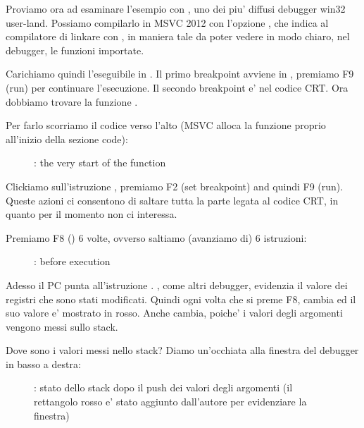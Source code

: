 \clearpage
{}
\myindex{\olly}

Proviamo ora ad esaminare l'esempio con \olly, uno dei piu' diffusi debugger win32 user-land.
Possiamo compilarlo in MSVC 2012 con l'opzione , che indica al compilatore di linkare con ,
in maniera tale da poter vedere in modo chiaro, nel debugger, le funzioni importate.

Carichiamo quindi l'eseguibile in \olly.
Il primo breakpoint avviene in , premiamo F9 (run) per continuare l'esecuzione. 
Il secondo breakpoint e' nel codice \ac{CRT}.
Ora dobbiamo trovare la funzione \main.

Per farlo scorriamo il codice verso l'alto (MSVC alloca la funzione \main proprio all'inizio della sezione code): 
\begin{figure}[H]
\centering
{}
\caption{\olly: the very start of the \main function}
\label{fig:printf3_olly_1}
\end{figure}

Clickiamo sull'istruzione , premiamo F2 (set breakpoint) and quindi F9 (run).
Queste azioni ci consentono di saltare tutta la parte legata al codice \ac{CRT}, in quanto per il momento non ci interessa.

\clearpage
Premiamo F8 (\stepover) 6 volte, ovverso saltiamo (avanziamo di) 6 istruzioni:

\begin{figure}[H]
\centering
{}
\caption{\olly: before \printf execution}
\label{fig:printf3_olly_2}
\end{figure}

Adesso il \ac{PC} punta all'istruzione .
\olly, come altri debugger, evidenzia il valore dei registri che sono stati modificati.
Quindi ogni volta che si preme F8, \EIP cambia ed il suo valore e' mostrato in rosso.
Anche \ESP cambia, poiche' i valori degli argomenti vengono messi sullo stack.

Dove sono i valori messi nello stack?
Diamo un'occhiata alla finestra del debugger in basso a destra:

\begin{figure}[H]
\centering

\caption{\olly: stato dello stack dopo il push dei valori degli argomenti (il rettangolo rosso e' stato aggiunto dall'autore per evidenziare la finestra)}
\end{figure}

